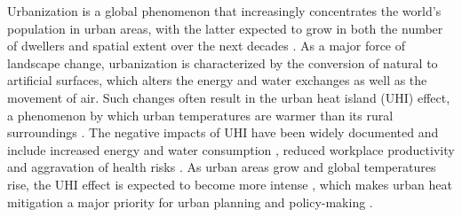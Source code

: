 \documentclass[10pt,letterpaper]{article}
\begin{document}
Urbanization is a global phenomenon that increasingly concentrates the world's population in urban areas, with the latter expected to grow in both the number of dwellers and spatial extent over the next decades \cite{seto2011meta, angel2012atlas, unitednations2018world}.
As a major force of landscape change, urbanization is characterized by the conversion of natural to artificial surfaces, which alters the energy and water exchanges as well as the movement of air. Such changes often result in the urban heat island (UHI) effect, a phenomenon by which urban temperatures are warmer than its rural surroundings \cite{oke1973city,oke1982energetic,arnfield2003two,voogt2003thermal,grimmond2007urbanization,phelan2015urban}. %
The negative impacts of UHI have been widely documented and include increased energy and water consumption \cite{akbari2001cool,golden2006energy,santamouris2015impact}, reduced workplace productivity \cite{kjellstrom2009workplace,zander2015heat} and aggravation of health risks \cite{chestnut1998analysis,kovats2008heat,laaidi2012impact}.
As urban areas grow and global temperatures rise, the UHI effect is expected to become more intense \cite{meehl2004more,huang2019projecting}, which makes urban heat mitigation a major priority for urban planning and policy-making \cite{geneletti2020planning}.
\end{document}
